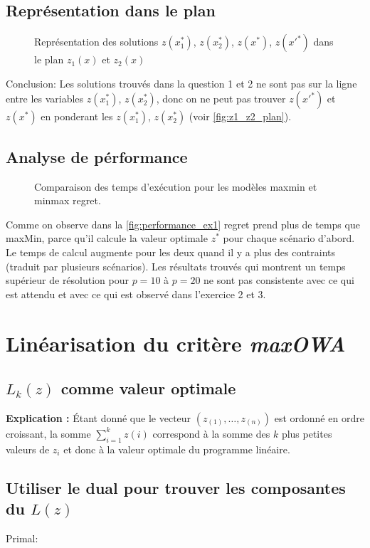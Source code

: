 \documentclass[10pt,a4paper]{report}
\begin{document}
\section{Représentation dans le plan}
\begin{figure}[h!]
    \centering
      
    \caption{Représentation des solutions $z(x^*_1)$, $z(x^*_2)$, $z(x^*)$, $z(x'^*)$ dans le plan $z_1(x)$ et $z_2(x)$}
    \label{fig:z1_z2_plan}
\end{figure}
Conclusion: Les solutions trouvés dans la question 1 et 2 ne sont pas sur la ligne entre les variables $z(x^*_1)$, $z(x^*_2)$, donc on ne peut pas trouver $z(x'^*)$ et $z(x^*)$ en ponderant les $z(x^*_1)$, $z(x^*_2)$ (voir \autoref{fig:z1_z2_plan}).
\section{Analyse de pérformance}
\begin{figure}[h!]
    \centering
      
    \caption{Comparaison des temps d'exécution pour les modèles maxmin et minmax regret.}
    \label{fig:performance_ex1}
\end{figure}
Comme on observe dans la \autoref{fig:performance_ex1} regret prend plus de temps que maxMin, parce qu'il calcule la valeur optimale $z^*$ pour chaque scénario d'abord. Le temps de calcul augmente pour les deux quand il y a plus des contraints (traduit par plusieurs scénarios). Les résultats trouvés qui montrent un temps supérieur de résolution pour $p=10$ à $p=20$ ne sont pas consistente avec ce qui est attendu et avec ce qui est observé dans l'exercice 2 et 3.
\chapter{Linéarisation du critère \textit{maxOWA}}
\section{$L_k(z)$ comme valeur optimale}
\textbf{Explication :} Étant donné que le vecteur $(z_{(1)}, \ldots, z_{(n)})$ est ordonné en ordre croissant, la somme $\sum_{i=1}^{k} z(i)$ correspond à la somme des $k$ plus petites valeurs de $z_i$ et donc à la valeur optimale du programme linéaire.
\section{Utiliser le dual pour trouver les composantes du $L(z)$ }
Primal:
\end{document}

